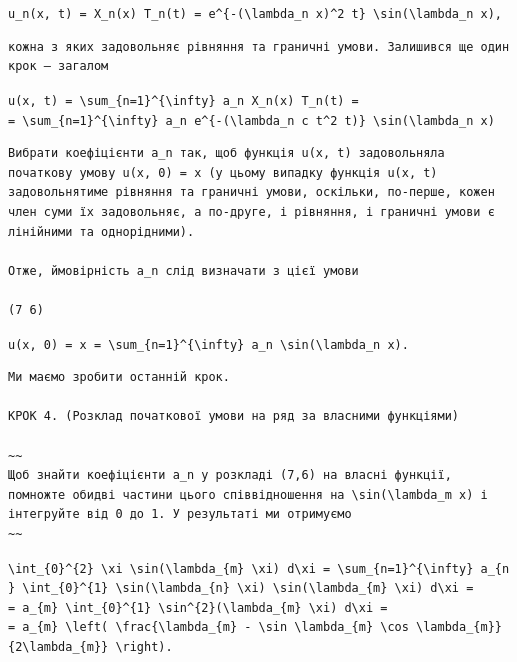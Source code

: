 \documentclass[
  ukrainian,
]{article}
\begin{document}
\texttt{u\_n(x,\ t)\ =\ X\_n(x)\ T\_n(t)\ =\ e\^{}\{-(\textbackslash{}lambda\_n\ x)\^{}2\ t\}\ \textbackslash{}sin(\textbackslash{}lambda\_n\ x),}

\begin{verbatim}
кожна з яких задовольняє рівняння та граничні умови. Залишився ще один крок — загалом
\end{verbatim}

\texttt{u(x,\ t)\ =\ \textbackslash{}sum\_\{n=1\}\^{}\{\textbackslash{}infty\}\ a\_n\ X\_n(x)\ T\_n(t)\ =}
\texttt{=\ \textbackslash{}sum\_\{n=1\}\^{}\{\textbackslash{}infty\}\ a\_n\ e\^{}\{-(\textbackslash{}lambda\_n\ c\ t\^{}2\ t)\}\ \textbackslash{}sin(\textbackslash{}lambda\_n\ x)}

\begin{verbatim}
Вибрати коефіцієнти a_n так, щоб функція u(x, t) задовольняла початкову умову u(x, 0) = x (у цьому випадку функція u(x, t) задовольнятиме рівняння та граничні умови, оскільки, по-перше, кожен член суми їх задовольняє, а по-друге, і рівняння, і граничні умови є лінійними та однорідними).

Отже, ймовірність a_n слід визначати з цієї умови

(7 6)
\end{verbatim}

\texttt{u(x,\ 0)\ =\ x\ =\ \textbackslash{}sum\_\{n=1\}\^{}\{\textbackslash{}infty\}\ a\_n\ \textbackslash{}sin(\textbackslash{}lambda\_n\ x).}

\begin{verbatim}
Ми маємо зробити останній крок.

КРОК 4. (Розклад початкової умови на ряд за власними функціями)

~~
Щоб знайти коефіцієнти a_n у розкладі (7,6) на власні функції, помножте обидві частини цього співвідношення на \sin(\lambda_m x) і інтегруйте від 0 до 1. У результаті ми отримуємо
~~
\end{verbatim}

\texttt{\textbackslash{}int\_\{0\}\^{}\{2\}\ \textbackslash{}xi\ \textbackslash{}sin(\textbackslash{}lambda\_\{m\}\ \textbackslash{}xi)\ d\textbackslash{}xi\ =\ \textbackslash{}sum\_\{n=1\}\^{}\{\textbackslash{}infty\}\ a\_\{n\}\ \textbackslash{}int\_\{0\}\^{}\{1\}\ \textbackslash{}sin(\textbackslash{}lambda\_\{n\}\ \textbackslash{}xi)\ \textbackslash{}sin(\textbackslash{}lambda\_\{m\}\ \textbackslash{}xi)\ d\textbackslash{}xi\ =}
\texttt{=\ a\_\{m\}\ \textbackslash{}int\_\{0\}\^{}\{1\}\ \textbackslash{}sin\^{}\{2\}(\textbackslash{}lambda\_\{m\}\ \textbackslash{}xi)\ d\textbackslash{}xi\ =}
\texttt{=\ a\_\{m\}\ \textbackslash{}left(\ \textbackslash{}frac\{\textbackslash{}lambda\_\{m\}\ -\ \textbackslash{}sin\ \textbackslash{}lambda\_\{m\}\ \textbackslash{}cos\ \textbackslash{}lambda\_\{m\}\}\{2\textbackslash{}lambda\_\{m\}\}\ \textbackslash{}right).}
\end{document}
